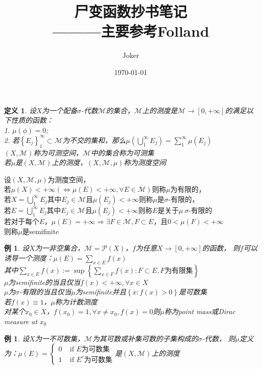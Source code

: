 \documentclass[12pt, a4paper, oneside]{ctexbook}
\title{{\Huge{\textbf{尸变函数抄书笔记}}}\\———主要参考Folland}
\author{Joker}
\date{\today}
\newtheorem{definition}[theorem]{定义}
\newtheorem{example}[theorem]{例}
\begin{document}
\begin{definition}
    设$X$为一个配备$\sigma$-代数$\mathcal{M}$的集合，$\mathcal{M}$上的测度是$\mathcal{M}\rightarrow[0,+\infty]$的满足以下性质的函数：\\
    1. $\mu(\phi)=0$;\\
    2. 若$\left\{E_j\right\}_1^{\infty}\subset\mathcal{M}$为不交的集和，那么$\mu(\bigcup_1^{\infty}E_j)=\sum_{1}^{\infty}\mu(E_j)$\\
    $(X,\mathcal{M})$称为可测空间，$\mathcal{M}$中的集合称为可测集\\
    若$\mu$是$(X,\mathcal{M})$上的测度，$(X,\mathcal{M},\mu)$称为测度空间
\end{definition}
    设$(X,\mathcal{M},\mu)$为测度空间，\\
    若$\mu(X)<+\infty(\Leftrightarrow\mu(E)<+\infty,\forall E\in\mathcal{M})$则称$\mu$为有限的，\\
    若$X=\bigcup_1^{\infty}E_j$其中$E_j\in\mathcal{M}$且$\mu(E_j)<+\infty$则称$\mu$是$\sigma$-有限的，\\
    若$E=\bigcup_1^{\infty}E_j$其中$E_j\in\mathcal{M}$且$\mu(E_j)<+\infty$则称$E$是关于$\mu\ \sigma$-有限的\\
    若对于每个$E$，$\mu(E)=+\infty\Rightarrow\exists F\in\mathcal{M},F\subset E$，且$0<\mu(F)<+\infty$\\
    则称$\mu$是semifinite
\begin{example}
    设$X$为一非空集合，$\mathcal{M}=\mathcal{P}(X)$，$f$为任意$X\rightarrow[0,+\infty]$的函数，
    则$f$可以诱导一个测度：$\mu(E)=\sum_{x\in E}f(x)$\\
    其中$\sum_{x\in E}f(x):=\sup\left\{\sum_{x\in F}f(x):F\subset E,F\text{为有限集}\right\}$\\
    $\mu$为semifinite的当且仅当$f(x)<+\infty,\forall x\in X$\\
    $\mu$为$\sigma$-有限的当且仅当$\mu$为semifinite并且$\left\{x:f(x)>0\right\}$是可数集\\
    若$f(x)\equiv 1$，$\mu$称为计数测度\\
    对某个$x_0\in X$，$f(x_0)=1,\forall x\neq x_0,f(x)=0$则$\mu$称为point mass或Dirac measure at $x_0$
\end{example}
\begin{example}
    设$X$为一不可数集，$\mathcal{M}$为其可数或补集可数的子集构成的$\sigma$-代数，
    则$\mu$定义为：$\mu(E)=\begin{cases}
        0& \text{ if } E\text{为可数集} \\
        1& \text{ if } E^c\text{为可数集}
      \end{cases}$是$(X,\mathcal{M})$上的测度
\end{example}
\end{document}
